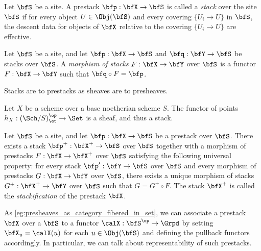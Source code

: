     \begin{definition}\label{def:stacks_in_categories}
        Let \(\bfS\) be a site.
        A prestack \(\bfp: \bfX \to \bfS\) is called a \emph{stack} over the site \(\bfS\) if for every object \(U \in \Obj(\bfS)\) and every covering \(\{ U_i \to U \}\) in \(\bfS\), the descent data for objects of \(\bfX\) relative to the covering \(\{ U_i \to U \}\) are effective.
    \end{definition}

    \begin{definition}\label{def:morphism_of_stacks}
        Let \(\bfS\) be a site, and let \(\bfp: \bfX \to \bfS\) and \(\bfq: \bfY \to \bfS\) be stacks over \(\bfS\).
        A \emph{morphism of stacks} \(F: \bfX \to \bfY\) over \(\bfS\) is a functor \(F: \bfX \to \bfY\) such that \(\bfq \circ F = \bfp\).
    \end{definition}

    \begin{slogan}\label{slogan:stacks_and_sheaves}
        Stacks are to prestacks as sheaves are to presheaves.
    \end{slogan}

    \begin{example}\label{eg:functor_of_points_as_stacks}
        Let \(X\) be a scheme over a base noetherian scheme \(S\).
        The functor of points \(h_X: (\Sch/S)_{\et}^{\op} \to \Set\) is a sheaf, and thus a stack.
    \end{example}

    \begin{construction}\label{const:stackification_of_prestacks}
        Let \(\bfS\) be a site, and let \(\bfp: \bfX \to \bfS\) be a prestack over \(\bfS\).
        There exists a stack \(\bfp^{+}: \bfX^{+} \to \bfS\) over \(\bfS\) together with a morphism of prestacks \(F: \bfX \to \bfX^{+}\) over \(\bfS\) satisfying the following universal property:
        for every stack \(\bfp': \bfY \to \bfS\) over \(\bfS\) and every morphism of prestacks \(G: \bfX \to \bfY\) over \(\bfS\),
        there exists a unique morphism of stacks \(G^{+}: \bfX^{+} \to \bfY\) over \(\bfS\) such that \(G = G^{+} \circ F\).
        The stack \(\bfX^{+}\) is called the \emph{stackification} of the prestack \(\bfX\).
    \end{construction}


    \begin{notation}
        As \cref{eg:presheaves_as_category_fibered_in_set}, we can associate a prestack \(\bfX\) over a \(\bfS\) to a functor \(\calX: \bfS^{\op} \to \Grpd\) by setting \(\bfX_u = \calX(u)\) for each \(u \in \Obj(\bfS)\) and defining the pullback functors accordingly.
        In particular, we can talk about representability of such prestacks.
    \end{notation}

